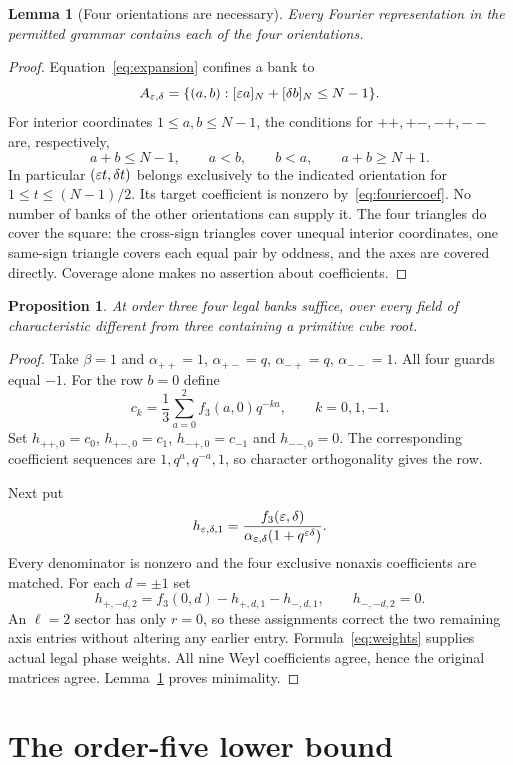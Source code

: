 \documentclass[11pt,letterpaper]{article}
\newtheorem{lemma}[theorem]{Lemma}
\newtheorem{proposition}[theorem]{Proposition}
\theoremstyle{definition}\newtheorem{definition}[theorem]{Definition}
\begin{document}
\begin{lemma}[Four orientations are necessary]\label{lem:support}
Every Fourier representation in the permitted grammar contains each of the four orientations.
\end{lemma}
\begin{proof}
Equation~\eqref{eq:expansion} confines a bank to
\[
 A_{\varepsilon,\delta}=\{(a,b):[\varepsilon a]_N+[\delta b]_N\leq N-1\}.
\]
For interior coordinates $1\leq a,b\leq N-1$, the conditions for $++,+-,-+,--$ are, respectively,
\[
 a+b\leq N-1,\qquad a<b,\qquad b<a,\qquad a+b\geq N+1.
\]
In particular $(\varepsilon t,\delta t)$ belongs exclusively to the indicated orientation for $1\leq t\leq(N-1)/2$. Its target coefficient is nonzero by~\eqref{eq:fouriercoef}. No number of banks of the other orientations can supply it. The four triangles do cover the square: the cross-sign triangles cover unequal interior coordinates, one same-sign triangle covers each equal pair by oddness, and the axes are covered directly. Coverage alone makes no assertion about coefficients.
\end{proof}

\begin{proposition}\label{prop:n3}
At order three four legal banks suffice, over every field of characteristic different from three containing a primitive cube root.
\end{proposition}
\begin{proof}
Take $\beta=1$ and $\alpha_{++}=1$, $\alpha_{+-}=q$, $\alpha_{-+}=q$, $\alpha_{--}=1$. All four guards equal $-1$. For the row $b=0$ define
\[
 c_k=\frac13\sum_{a=0}^2f_3(a,0)q^{-ka},\qquad k=0,1,-1.
\]
Set $h_{++,0}=c_0$, $h_{+-,0}=c_1$, $h_{-+,0}=c_{-1}$ and $h_{--,0}=0$. The corresponding coefficient sequences are $1,q^a,q^{-a},1$, so character orthogonality gives the row.

Next put
\[
 h_{\varepsilon,\delta,1}
 =\frac{f_3(\varepsilon,\delta)}{\alpha_{\varepsilon,\delta}(1+q^{\varepsilon\delta})}.
\]
Every denominator is nonzero and the four exclusive nonaxis coefficients are matched. For each $d=\pm1$ set
\[
 h_{+,-d,2}=f_3(0,d)-h_{+,d,1}-h_{-,d,1},
 \qquad h_{-,-d,2}=0.
\]
An $\ell=2$ sector has only $r=0$, so these assignments correct the two remaining axis entries without altering any earlier entry. Formula~\eqref{eq:weights} supplies actual legal phase weights. All nine Weyl coefficients agree, hence the original matrices agree. Lemma~\ref{lem:support} proves minimality.
\end{proof}

\section{The order-five lower bound}\label{sec:n5lower}
\end{document}
